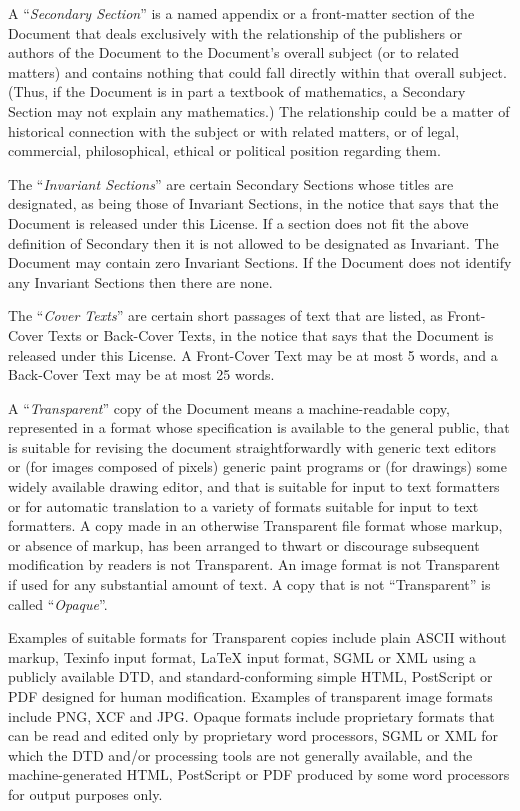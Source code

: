 \documentclass[a4paper,openany]{book}
\begin{document}
\begin{results}
A ``\emph{Secondary Section}'' is a named appendix or a front-matter section of
the Document that deals exclusively with the relationship of the
publishers or authors of the Document to the Document's overall subject
(or to related matters) and contains nothing that could fall directly
within that overall subject.  (Thus, if the Document is in part a
textbook of mathematics, a Secondary Section may not explain any
mathematics.)  The relationship could be a matter of historical
connection with the subject or with related matters, or of legal,
commercial, philosophical, ethical or political position regarding
them.

The ``\emph{Invariant Sections}'' are certain Secondary Sections whose titles
are designated, as being those of Invariant Sections, in the notice
that says that the Document is released under this License.  If a
section does not fit the above definition of Secondary then it is not
allowed to be designated as Invariant.  The Document may contain zero
Invariant Sections.  If the Document does not identify any Invariant
Sections then there are none.

The ``\emph{Cover Texts}'' are certain short passages of text that are listed,
as Front-Cover Texts or Back-Cover Texts, in the notice that says that
the Document is released under this License.  A Front-Cover Text may
be at most 5 words, and a Back-Cover Text may be at most 25 words.

A ``\emph{Transparent}'' copy of the Document means a machine-readable copy,
represented in a format whose specification is available to the
general public, that is suitable for revising the document
straightforwardly with generic text editors or (for images composed of
pixels) generic paint programs or (for drawings) some widely available
drawing editor, and that is suitable for input to text formatters or
for automatic translation to a variety of formats suitable for input
to text formatters.  A copy made in an otherwise Transparent file
format whose markup, or absence of markup, has been arranged to thwart
or discourage subsequent modification by readers is not Transparent.
An image format is not Transparent if used for any substantial amount
of text.  A copy that is not ``Transparent'' is called ``\emph{Opaque}''.

Examples of suitable formats for Transparent copies include plain
ASCII without markup, Texinfo input format, \LaTeX{} input format, SGML
or XML using a publicly available DTD, and standard-conforming simple
HTML, PostScript or PDF designed for human modification.  Examples of
transparent image formats include PNG, XCF and JPG.  Opaque formats
include proprietary formats that can be read and edited only by
proprietary word processors, SGML or XML for which the DTD and/or
processing tools are not generally available, and the
machine-generated HTML, PostScript or PDF produced by some word
processors for output purposes only.


\end{results}
\end{document}
